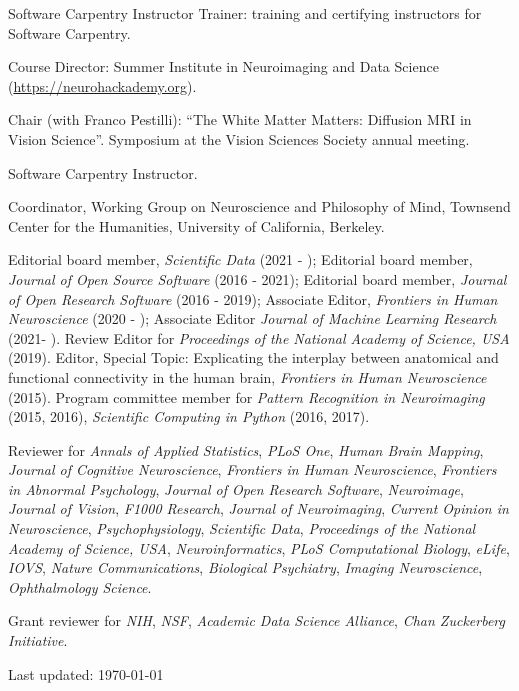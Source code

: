 \documentclass[11pt,fullpage]{article}
\newcommand{\years}[1]{\marginnote{\scriptsize #1}} %
\begin{document}
\years{2016 -- } Software Carpentry Instructor Trainer: training and certifying instructors for Software Carpentry.

\years{2016 --} Course Director: Summer Institute in Neuroimaging and Data Science (\url{https://neurohackademy.org}).

\years{2014} Chair (with Franco Pestilli): ``The White Matter Matters: Diffusion MRI in Vision Science''. Symposium at the Vision Sciences Society annual meeting.

\years{2012 --}  Software Carpentry Instructor.

\years{2007 - 2008} Coordinator, Working Group on Neuroscience and Philosophy of Mind, Townsend Center for the Humanities, University of California, Berkeley.

\vspace{4pt}

Editorial board member, \emph{Scientific Data} (2021 - ); Editorial board member, \emph{Journal of Open Source Software} (2016 - 2021);  Editorial board member, \emph{Journal of Open Research Software} (2016 - 2019); Associate Editor, \emph{Frontiers in Human Neuroscience} (2020 - ); Associate Editor \emph{Journal of Machine Learning Research} (2021- ). Review Editor for \emph{Proceedings of the National Academy of Science, USA} (2019). Editor, Special Topic: Explicating the interplay between anatomical and functional connectivity in the human brain, \emph{Frontiers in Human Neuroscience} (2015). Program committee member for \emph{Pattern Recognition in Neuroimaging} (2015, 2016), \emph{Scientific Computing in Python} (2016, 2017).

\vspace{4pt}

Reviewer for \emph{Annals of Applied Statistics}, \emph{PLoS One}, \emph{Human Brain Mapping}, \emph{Journal of Cognitive Neuroscience}, \emph{Frontiers in Human Neuroscience}, \emph{Frontiers in Abnormal Psychology}, \emph{Journal of Open Research Software}, \emph{Neuroimage}, \emph{Journal of Vision}, \emph{F1000 Research}, \emph{Journal of Neuroimaging}, \emph{Current Opinion in Neuroscience}, \emph{Psychophysiology}, \emph{Scientific Data}, \emph{Proceedings of the National Academy of Science, USA}, \emph{Neuroinformatics}, \emph{PLoS Computational Biology}, \emph{eLife}, \emph{IOVS}, \emph{Nature Communications}, \emph{Biological Psychiatry}, \emph{Imaging Neuroscience}, \emph{Ophthalmology Science}.

\vspace{4pt}

Grant reviewer for \emph{NIH}, \emph{NSF}, \emph{Academic Data Science Alliance}, \emph{Chan Zuckerberg Initiative}.


\bigskip
\begin{center}
  \begin{footnotesize}
    Last updated: \today
  \end{footnotesize}
\end{center}

\end{document}
